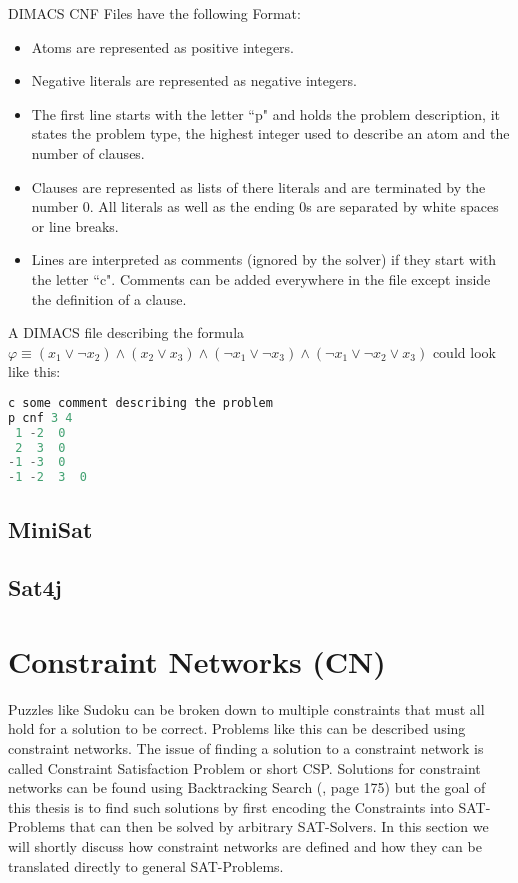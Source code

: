 DIMACS CNF Files have the following Format:
\begin{itemize}
    \item Atoms are represented as positive integers.
    \item Negative literals are represented as negative integers.
    \item The first line starts with the letter ``p" and holds the problem description, it states the problem type, the highest integer used to describe an atom and the number of clauses.
    \item Clauses are represented as lists of there literals and are terminated by the number 0. All literals as well as the ending 0s are separated by white spaces or line breaks.
    \item Lines are interpreted as comments (ignored by the solver) if they start with the letter ``c". Comments can be added everywhere in the file except inside the definition of a clause.
\end{itemize}
A DIMACS file describing the formula $\varphi \equiv (x_1 \lor \neg x_2) \land (x_2 \lor x_3) \land (\neg x_1 \lor \neg x_3) \land (\neg x_1 \lor \neg x_2 \lor x_3)$ could look like this:

\lstset{basicstyle=\ttfamily}
\begin{lstlisting}[language=Java,frame=single]
c some comment describing the problem
p cnf 3 4
 1 -2  0
 2  3  0
-1 -3  0
-1 -2  3  0
\end{lstlisting}

\subsection{MiniSat} 	
\lipsum[1]

\subsection{Sat4j} 	
\lipsum[1]

\section{Constraint Networks (CN)}
Puzzles like Sudoku can be broken down to multiple constraints that must all hold for a solution to be correct. Problems like this can be described using constraint networks. The issue of finding a solution to a constraint network is called Constraint Satisfaction Problem or short CSP. Solutions for constraint networks can be found using Backtracking Search (\cite{ArtificialAModernApproach}, page 175) but the goal of this thesis is to find such solutions by first encoding the Constraints into SAT-Problems that can then be solved by arbitrary SAT-Solvers. In this section we will shortly discuss how constraint networks are defined and how they can be translated directly to general SAT-Problems.


